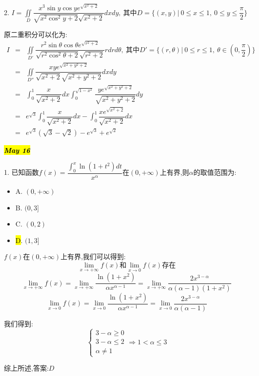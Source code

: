 2. $I=\iint\limits_{D}\dfrac{x^3\sin y\cos y e^{\sqrt{x^2+2}}}{\sqrt{x^2\cos^2y+2}\sqrt{x^2+2}}dxdy,\ \text{其中}D=\{(x,y)|\ 0\leq x\leq 1,\ 0\leq y\leq \dfrac{\pi}{2}\}$
\begin{solution}
	
	原二重积分可以化为: 
	\begin{eqnarray*}
		I&=&\iint\limits_{D'}\dfrac{r^2\sin \theta\cos \theta e^{\sqrt{r^2+2}}}{\sqrt{r^2\cos^2\theta+2}\sqrt{r^2+2}}rdrd\theta,\ \text{其中}D'=\{(r,\theta)|\ 0\leq r\leq 1,\ \theta\in(0,\dfrac{\pi}{2})\}\\
		&=&\iint\limits_{D''}\dfrac{xye^{\sqrt{x^2+y^2+2}}}{\sqrt{x^2+2}\sqrt{x^2+y^2+2}}dxdy\\
		&=&\int_{0}^{1}\dfrac{x}{\sqrt{x^2+2}}dx\int_{0}^{\sqrt{1-x^2}}\dfrac{ye^{\sqrt{x^2+y^2+2}}}{\sqrt{x^2+y^2+2}}dy\\
		&=&e^{\sqrt{3}}\int_{0}^{1}\dfrac{x}{\sqrt{x^2+2}}dx-\int_{0}^{1}\dfrac{xe^{\sqrt{x^2+2}}}{\sqrt{x^2+2}}dx\\
		&=&e^{\sqrt{3}}(\sqrt{3}-\sqrt{2})-e^{\sqrt{3}}+e^{\sqrt{2}}
	\end{eqnarray*}
\end{solution}

\hl{\textbf{\textit{May 16}}}

1. 已知函数$f(x)=\dfrac{\int_{0}^{x}\ln(1+t^2)dt}{x^{\alpha}}$在$(0,+\infty)$上有界,则$\alpha$的取值范围为: 
\begin{itemize}
	\item A. $(0,+\infty)$ 
	\item B. $(0,3]$ 
	\item C. $(0,2)$ 
	\item \hl{D}. $(1,3]$ 
\end{itemize}
\begin{solution}
	
	$f(x)$在$(0,+\infty)$上有界,我们可以得到: 
	$$\lim\limits_{x\rightarrow +\infty}f(x)\text{和}\lim\limits_{x\rightarrow 0}f(x)\text{存在}$$
	$$\lim\limits_{x\rightarrow +\infty}f(x)=\lim\limits_{x\rightarrow +\infty}\dfrac{\ln(1+x^2)}{\alpha x^{\alpha-1}}=\lim\limits_{x\rightarrow +\infty}\dfrac{2x^{3-\alpha}}{\alpha(\alpha-1)(1+x^2)}$$
	$$\lim\limits_{x\rightarrow 0}f(x)=\lim\limits_{x\rightarrow 0}\dfrac{\ln(1+x^2)}{\alpha x^{\alpha-1}}=\lim\limits_{x\rightarrow 0}\dfrac{2x^{3-\alpha}}{\alpha(\alpha-1)}$$
	
	我们得到: 
	$$\left\lbrace 
	\begin{array}{l}
		3-\alpha\geq 0\\
		3-\alpha\leq 2\\
		\alpha\neq 1
	\end{array}
	\right. \Rightarrow 1<\alpha\leq 3$$
	
	综上所述,答案:$D$
\end{solution}

